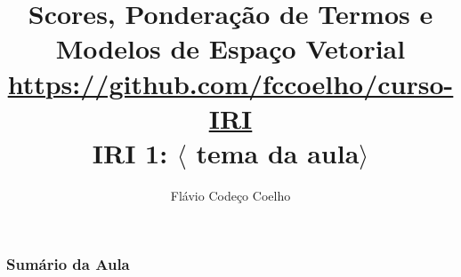 \documentclass[compress]{beamer}
\title[Coelho: $\langle$ Scores e Modelo vetorial $\rangle$]
{Scores, Ponderação de Termos e Modelos de Espaço Vetorial\\
\large \url{https://github.com/fccoelho/curso-IRI}\\[0.5cm]
IRI 1: $\langle$ tema da aula$\rangle$}
\author [Coelho F.C. \& Souza R.R.]{ Flávio Codeço Coelho}
\institute [EMAp, FGV]{Escola de Matemática Aplicada,   Fundação Getúlio Vargas}
\date
\begin{document}
\begin{frame}
\titlepage
\end{frame}

\begin{frame}[fragile]
\frametitle{Sumário da Aula}
\tableofcontents
\end{frame}
\end{document}
